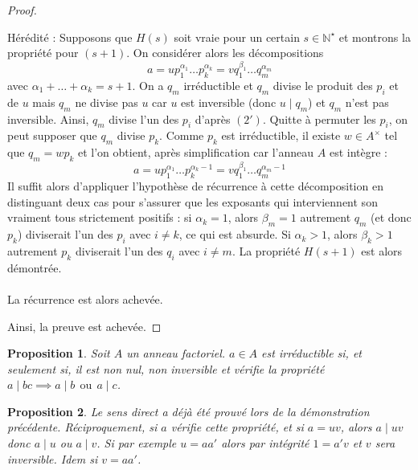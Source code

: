 \documentclass[french]{book}
\newcommand{\N}{\mathbb{N}}
\newcommand{\st}{^\star}
\theoremstyle{plain}
\newtheorem{prop}{Proposition}[chapter]
\theoremstyle{definition}
\theoremstyle{remark}
\begin{document}
\begin{proof}
\begin{itemize}
		Hérédité : Supposons que $H(s)$ soit vraie pour un certain $s\in\N\st$ et montrons la propriété pour $(s+1)$. On considérer alors les décompositions $$a=up_1^{\alpha_1}\ldots p_k^{\alpha_k}=vq_1^{\beta_1}\ldots q_m^{\alpha_m}$$ avec $\alpha_1+\ldots+\alpha_k=s+1$. On a $q_m$ irréductible et $q_m$ divise le produit des $p_i$ et de $u$ mais $q_m$ ne divise pas $u$ car $u$ est inversible (donc $u\mid q_m$) et $q_m$ n'est pas inversible. Ainsi, $q_m$ divise l'un des $p_i$ d'après $(2')$. Quitte à permuter les $p_i$, on peut supposer que $q_m$ divise $p_k$. Comme $p_k$ est irréductible, il existe $w\in A^\times$ tel que $q_m=wp_k$ et l'on obtient, après simplification car l'anneau $A$ est intègre : $$a=up_1^{\alpha_1}\ldots p_k^{\alpha_k-1}=vq_1^{\beta_1}\ldots q_m^{\alpha_m-1}$$ Il suffit alors d'appliquer l'hypothèse de récurrence à cette décomposition en distinguant deux cas pour s'assurer que les exposants qui interviennent son vraiment tous strictement positifs : si $\alpha_k=1$, alors $\beta_m=1$ autrement $q_m$ (et donc $p_k$) diviserait l'un des $p_i$ avec $i\ne k$, ce qui est absurde. Si $\alpha_k>1$, alors $\beta_k>1$ autrement $p_k$ diviserait l'un des $q_i$ avec $i\ne m$. La propriété $H(s+1)$ est alors démontrée. \\ \\ La récurrence est alors achevée.
	\end{itemize}
	Ainsi, la preuve est achevée.
\end{proof}
\begin{prop}
	Soit $A$ un anneau factoriel. $a\in A$ est irréductible si, et seulement si, il est non nul, non inversible et vérifie la propriété $a\mid bc\implies a\mid b\ \ \text{ou}\ \ a\mid c$.
\end{prop}
\begin{prop}
	Le sens direct a déjà été prouvé lors de la démonstration précédente. Réciproquement, si $a$ vérifie cette propriété, et si $a=uv$, alors $a\mid uv$ donc $a\mid u$ ou $a\mid v$. Si par exemple $u=aa'$ alors par intégrité $1=a'v$ et $v$ sera inversible. Idem si $v=aa'$.
\end{prop}
\end{document}
